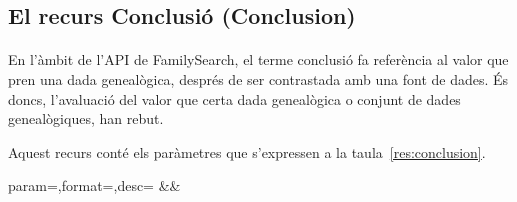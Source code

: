 \subsection{El recurs Conclusió (Conclusion)}

    \paragraph{}
    En l'àmbit de l'API de FamilySearch, el terme conclusió fa referència al valor que pren una dada genealògica, després de ser contrastada amb una font de dades. És doncs, l'avaluació del valor que certa dada genealògica o conjunt de dades genealògiques, han rebut.

    Aquest recurs conté els paràmetres que s'expressen a la taula~\ref{res:conclusion}.

    \begin{center}
             {param=\param,format=\format,desc=\desc}
             {\param&\format&\desc}
     \end{center}
